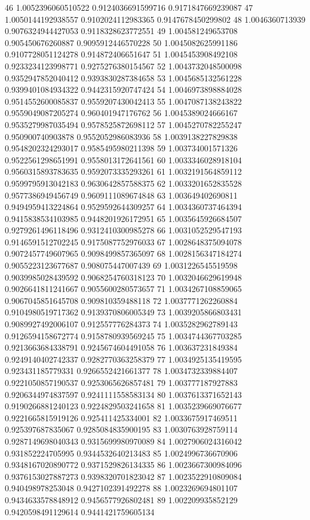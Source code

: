46	1.0052396060510522	0.9124036691599716	0.9171847669239087
47	1.0050144192938557	0.9102024112983365	0.9147678450299802
48	1.0046360713939	0.9076324944427053	0.9118328623772551
49	1.004581249653708	0.905450676260887	0.9095912446570228
50	1.0045082625991186	0.9107728051124278	0.914872406651647
51	1.0045453908492108	0.9233234123998771	0.9275276380154567
52	1.0043732048500098	0.9352947852040412	0.9393830287384658
53	1.0045685132561228	0.9399401084934322	0.9442315920747424
54	1.0046973898884028	0.9514552600085837	0.9559207430042413
55	1.0047087138243822	0.9559049087205274	0.960401947176762
56	1.0045389024666167	0.9535279987035494	0.9578525872698112
57	1.0045270782255247	0.950900740903878	0.9552052986083936
58	1.0039138227829838	0.9548202324293017	0.9585495980211398
59	1.003734001571326	0.9522561298651991	0.9558013172641561
60	1.0033346028918104	0.9560315893783635	0.9592073335293261
61	1.0032191564859112	0.9599795913042183	0.9630642857588375
62	1.0033201652835528	0.9577386949456749	0.9609111089674848
63	1.003649402690811	0.9494959413224864	0.9529592644309257
64	1.0034360737464394	0.9415838534103985	0.9448201926172951
65	1.0035645926684507	0.9279261496118496	0.9312410300985278
66	1.0031052529547193	0.9146591512702245	0.9175087752976033
67	1.0028648375094078	0.9072457749607965	0.9098499857365097
68	1.0028156347184274	0.9055223123677687	0.908075447007439
69	1.0031226545519598	0.9039985028439592	0.9068254760318123
70	1.0032046629619948	0.9026641811241667	0.9055600280573657
71	1.0034267108859065	0.9067045851645708	0.909810359488118
72	1.0037771262260884	0.9104980519717362	0.9139370806005349
73	1.0039205866803431	0.9089927492006107	0.912557776284373
74	1.0035282962789143	0.9126594158672774	0.9158780939569245
75	1.0034744367703285	0.9213663684338791	0.9245674604491058
76	1.003637231849384	0.9249140402742337	0.9282770363258379
77	1.0034925135419595	0.923431185779331	0.9266552421661377
78	1.0034732339884407	0.9221050857190537	0.9253065626857481
79	1.003777187927883	0.9206344974837597	0.9241111558583134
80	1.0037613371652143	0.9190266881240123	0.9224829503241658
81	1.0035239669076677	0.9221665815919126	0.925411425334001
82	1.0033675917469511	0.925397687835067	0.9285084835900195
83	1.0030763928759114	0.9287149698040343	0.9315699980970089
84	1.0027906024316042	0.931852224705995	0.9344532640213483
85	1.0024996736670906	0.9348167020890772	0.9371529826134335
86	1.0023667300984096	0.9376153027887273	0.9398320701823042
87	1.0023522910809084	0.940498978253048	0.9427102391492278
88	1.0023269694801107	0.9434633578848912	0.9456577926802481
89	1.002209935852129	0.9420598491129614	0.9441421759605134
